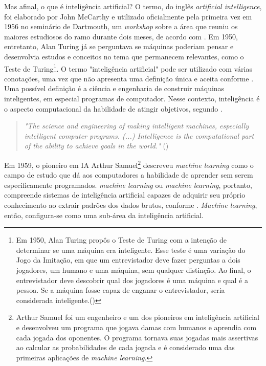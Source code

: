 Mas afinal, o que é inteligência artificial? O termo, do
inglês \textit{artificial intelligence}, foi elaborado por John McCarthy e utilizado 
oficialmente pela primeira vez em 1956 no seminário de 
Dartmouth, um \textit{workshop} sobre a área que reuniu os 
maiores estudiosos do ramo durante dois meses, de acordo com \cite{aima}.
Em 1950, entretanto, Alan Turing já se perguntava se máquinas 
poderiam pensar e desenvolvia estudos e conceitos no tema que permanecem relevantes,
como o Teste de Turing\footnote{Em 1950, Alan Turing propôs o 
Teste de Turing com a intenção de determinar se uma máquina era inteligente. Esse teste é uma variação 
do Jogo da Imitação, em que um entrevistador deve fazer perguntas a dois jogadores, um 
humano e uma máquina, sem qualquer distinção. Ao final, o entrevistador deve
descobrir qual dos jogadores é uma máquina e qual é a pessoa. Se 
a máquina fosse capaz de enganar o entrevistador, seria considerada
inteligente.(\cite{turing})}.
O termo "inteligência artificial" pode ser utilizado com
várias conotações, uma vez que não apresenta uma definição 
única e aceita conforme \citet{wang2019defining}. Uma possível definição
é a ciência e engenharia de 
construir máquinas inteligentes, em especial programas 
de computador. Nesse contexto, inteligência é o aspecto
computacional da habilidade de atingir objetivos, segundo \citet{what-is-ai}.

\begin{quote}
  \textit{"The science and
  engineering of making intelligent machines, 
  especially intelligent computer programs. (...)
  Intelligence is the computational part of the ability 
  to achieve goals in the world."} (\cite{what-is-ai})
\end{quote}

Em 1959, o pioneiro em IA Arthur Samuel\footnote{Arthur Samuel
foi um engenheiro e um dos pioneiros em inteligência artificial e
desenvolveu um programa que jogava damas com humanos e aprendia
com cada jogada dos oponentes. O programa tornava suas jogadas mais 
assertivas ao calcular as probabilidades de cada jogada e é 
considerado uma das primeiras aplicações de \textit{machine learning}.
} descreveu 
\textit{machine learning} como o campo de estudo que dá aos 
computadores a habilidade de aprender sem serem especificamente
programados. \textit{machine learning} ou \textit{machine learning}, 
portanto, compreende sistemas de inteligência 
artificial capazes de adquirir seu próprio conhecimento 
ao extrair padrões dos dados brutos, conforme \citet{Goodfellow-et-al-2016}.
\textit{Machine learning}, então, configura-se como uma 
sub-área da inteligência artificial.


